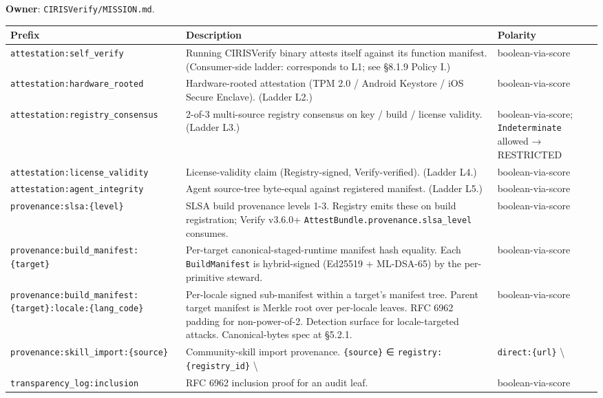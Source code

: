 \documentclass[11pt]{article}
\begin{document}
\textbf{Owner}: \texttt{CIRISVerify/MISSION.md}.


{\footnotesize
\begin{longtable}{|p{5.33cm}|p{5.33cm}|p{5.33cm}|}\hline
\textbf{Prefix} & \textbf{Description} & \textbf{Polarity} \\ \hline\endhead
\texttt{attestation:self\_verify} & Running CIRISVerify binary attests itself against its function manifest. (Consumer-side ladder: corresponds to L1; see §8.1.9 Policy I.) & boolean-via-score \\ \hline
\texttt{attestation:hardware\_rooted} & Hardware-rooted attestation (TPM 2.0 / Android Keystore / iOS Secure Enclave). (Ladder L2.) & boolean-via-score \\ \hline
\texttt{attestation:registry\_consensus} & 2-of-3 multi-source registry consensus on key / build / license validity. (Ladder L3.) & boolean-via-score; \texttt{Indeterminate} allowed → RESTRICTED \\ \hline
\texttt{attestation:license\_validity} & License-validity claim (Registry-signed, Verify-verified). (Ladder L4.) & boolean-via-score \\ \hline
\texttt{attestation:agent\_integrity} & Agent source-tree byte-equal against registered manifest. (Ladder L5.) & boolean-via-score \\ \hline
\texttt{provenance:slsa:\{level\}} & SLSA build provenance levels 1-3. Registry emits these on build registration; Verify v3.6.0+ \texttt{AttestBundle.provenance.slsa\_level} consumes. & boolean-via-score \\ \hline
\texttt{provenance:build\_manifest:\{target\}} & Per-target canonical-staged-runtime manifest hash equality. Each \texttt{BuildManifest} is hybrid-signed (Ed25519 + ML-DSA-65) by the per-primitive steward. & boolean-via-score \\ \hline
\texttt{provenance:build\_manifest:\{target\}:locale:\{lang\_code\}} & Per-locale signed sub-manifest within a target's manifest tree. Parent target manifest is Merkle root over per-locale leaves. RFC 6962 padding for non-power-of-2. Detection surface for locale-targeted attacks. Canonical-bytes spec at §5.2.1. & boolean-via-score \\ \hline
\texttt{provenance:skill\_import:\{source\}} & Community-skill import provenance. \texttt{\{source\}} ∈ \texttt{registry:\{registry\_id\}} \textbackslash{} & \texttt{direct:\{url\}} \textbackslash{} \\ \hline
\texttt{transparency\_log:inclusion} & RFC 6962 inclusion proof for an audit leaf. & boolean-via-score \\ \hline

\end{longtable}}
\end{document}
